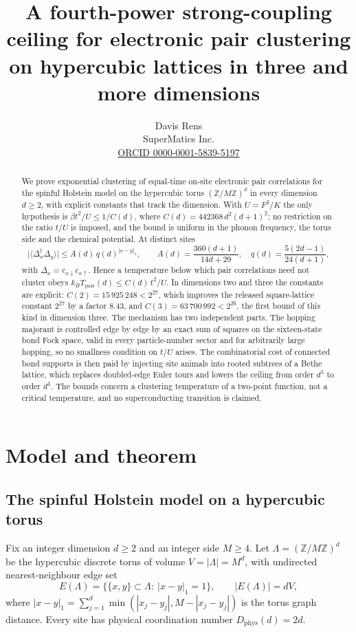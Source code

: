 \documentclass[11pt]{article}
\title{A fourth-power strong-coupling ceiling for electronic pair clustering
on hypercubic lattices in three and more dimensions}
\author{Davis Rens\\SuperMatics Inc.\\\href{https://orcid.org/0000-0001-5839-5197}{ORCID 0000-0001-5839-5197}}
\date{}
\theoremstyle{plain}
\theoremstyle{definition}
\newcommand{\Dphys}{D_{\mathrm{phys}}}
\newcommand{\Dop}{\Delta}
\begin{document}
\maketitle

\begin{abstract}
We prove exponential clustering of equal-time on-site electronic pair correlations
for the spinful Holstein model on the hypercubic torus $(\mathbb{Z}/M\mathbb{Z})^d$
in every dimension $d\ge2$, with explicit constants that track the dimension.
With $U=F^2/K$ the only hypothesis is
$\beta t^2/U\le 1/C(d)$, where $C(d)=442368\,d^2(d+1)^2$; no restriction on the
ratio $t/U$ is imposed, and the bound is uniform in the phonon frequency, the torus
side and the chemical potential. At distinct sites
\[
 \bigl|\langle\Dop_x^\dagger\Dop_y\rangle\bigr|\le A(d)\,q(d)^{|x-y|_1},
 \qquad A(d)=\frac{360(d+1)}{14d+29},\quad q(d)=\frac{5(2d-1)}{24(d+1)},
\]
with $\Dop_x=c_{x\downarrow}c_{x\uparrow}$. Hence a temperature below which pair
correlations need not cluster obeys $k_BT_{\mathrm{pair}}(d)\le C(d)\,t^2/U$.
In dimensions two and three the constants are explicit: $C(2)=15\,925\,248<2^{27}$,
which improves the released square-lattice constant $2^{27}$ by a factor $8.43$,
and $C(3)=63\,700\,992<2^{26}$, the first bound of this kind in dimension three.
The mechanism has two independent parts. The hopping majorant is controlled edge by
edge by an exact sum of squares on the sixteen-state bond Fock space, valid in every
particle-number sector and for arbitrarily large hopping, so no smallness condition
on $t/U$ arises. The combinatorial cost of connected bond supports is then paid by
injecting site animals into rooted subtrees of a Bethe lattice, which replaces
doubled-edge Euler tours and lowers the ceiling from order $d^5$ to order $d^4$.
The bounds concern a clustering temperature of a two-point function, not a critical
temperature, and no superconducting transition is claimed.
\end{abstract}

\section{Model and theorem}\label{sec:model}

\subsection{The spinful Holstein model on a hypercubic torus}

Fix an integer dimension $d\ge2$ and an integer side $M\ge4$. Let
$\Lambda=(\mathbb{Z}/M\mathbb{Z})^d$ be the hypercubic discrete torus of volume
$V=|\Lambda|=M^d$, with undirected nearest-neighbour edge set
\[
 E(\Lambda)=\bigl\{\{x,y\}\subset\Lambda:\ |x-y|_1=1\bigr\},
 \qquad |E(\Lambda)|=dV,
\]
where $|x-y|_1=\sum_{j=1}^d\min(|x_j-y_j|,M-|x_j-y_j|)$ is the torus graph
distance. Every site has physical coordination number $\Dphys(d)=2d$.
\end{document}
